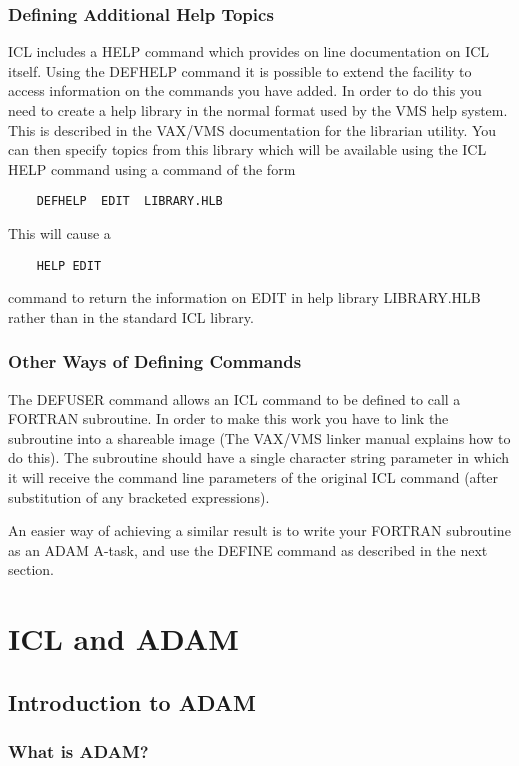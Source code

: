 \section{Defining Additional Help Topics}

ICL includes a HELP command which provides on line documentation on ICL
itself. Using the DEFHELP command it is possible to extend the facility
to access information on the commands you have added. In order to do this
you need to create a help library in the normal format used by the VMS
help system. This is described in the VAX/VMS documentation for the librarian
utility. You can then specify topics from this library which will be
available using the ICL HELP command using a command of the form
\begin{verbatim}
    DEFHELP  EDIT  LIBRARY.HLB
\end{verbatim}
This will cause a
\begin{verbatim}
    HELP EDIT
\end{verbatim}
command to return the information on EDIT in help library LIBRARY.HLB rather
than in the standard ICL library.

\section{Other Ways of Defining Commands}

The DEFUSER command allows an ICL command to be defined to call a FORTRAN
subroutine. In order to make this work you have to link the subroutine into
a shareable image (The VAX/VMS linker manual explains how to do this). The
subroutine should have a single character string parameter in which it will
receive the command line parameters of the original ICL command (after
substitution of any bracketed expressions).

An easier way of achieving a similar result is to write your FORTRAN
subroutine as an ADAM A-task, and use the DEFINE command as described in
the next section.
                    
\part{ICL and ADAM}

\chapter{Introduction to ADAM}

\section{What is ADAM?}

